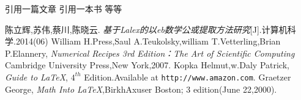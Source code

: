 \documentclass{ctexart}
\begin{document}

    引用一篇文章 \cite{article1}引用一本书 \cite{book1}等等

    \begin{thebibliography}{99}
         陈立辉,苏伟,蔡川,陈晓云. \emph{基于Lalex的以eb数学公或提取方法研究}[J].计算机科学.2014(06)
         William H.Press,Saul A.Teukolsky,william T.Vetterling,Brian P.Elannery, \emph{Numerical Recipes 3rd Edition：The Art of Scientific Computing} Cambridge University Press,New York,2007.
         Kopka Helmut,w.Daly Patrick, \emph{Guide to \LaTeX }, $4^{th}$ Edition.Available at \texttt{http://www.amazon.com}.
         Graetzer George, \emph{Math Into \LaTeX },BirkhAxuser Boston; 3 edition(June 22,2000).
    \end{thebibliography}
\end{document}
